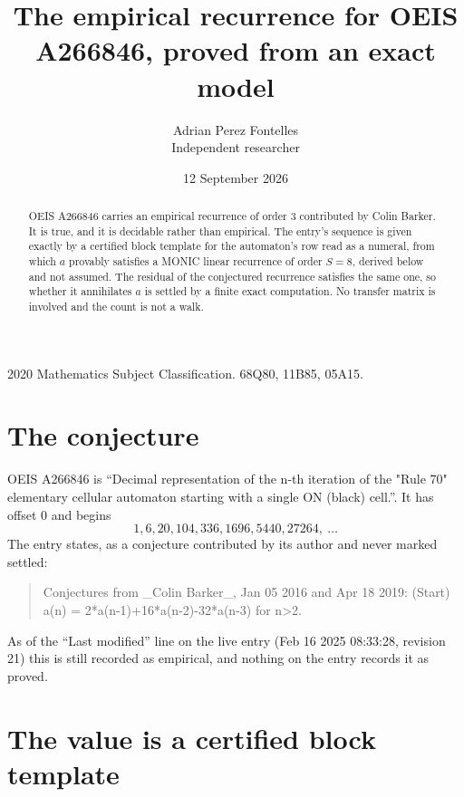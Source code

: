 \documentclass[11pt,a4paper]{article}
\title{The empirical recurrence for OEIS A266846, proved from an exact model}
\author{Adrian Perez Fontelles\\ \small Independent researcher}
\date{12 September 2026}
\theoremstyle{plain}
\theoremstyle{definition}
\begin{document}
\maketitle

\begin{abstract}
OEIS A266846 carries an empirical recurrence of order $3$ contributed by Colin Barker. It is true, and it is
decidable rather than empirical. The entry's sequence is given exactly by a certified block template for the automaton's row read as a numeral, from
which $a$ provably satisfies a MONIC linear recurrence of order $S=8$, derived below and not
assumed. The residual of the conjectured recurrence satisfies the same one, so whether it
annihilates $a$ is settled by a finite exact computation. No transfer matrix is involved and
the count is not a walk.
\end{abstract}

\noindent\small 2020 Mathematics Subject Classification. 68Q80, 11B85, 05A15.\normalsize

\section{The conjecture}

OEIS A266846 is ``Decimal representation of the n-th iteration of the "Rule 70" elementary cellular automaton starting with a single ON (black) cell.''. It has offset $0$ and begins
\[
1, 6, 20, 104, 336, 1696, 5440, 27264,\ \dots
\]
The entry states, as a conjecture contributed by its author and never marked settled:
\begin{quote}
Conjectures from \_Colin Barker\_, Jan 05 2016 and Apr 18 2019: (Start) a(n) = 2*a(n-1)+16*a(n-2)-32*a(n-3) for n>2.
\end{quote}
As of the ``Last modified'' line on the live entry (Feb 16 2025 08:33:28, revision 21)
this is still recorded as empirical, and nothing on the entry records it as proved.

\section{The value is a certified block template}
\end{document}
